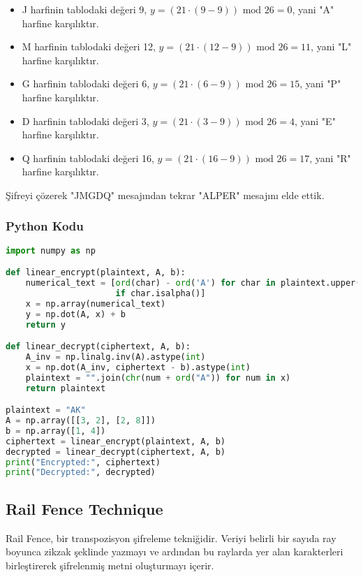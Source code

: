 \begin{itemize}
    \item J harfinin tablodaki değeri 9, $y = (21 \cdot (9 - 9)) \text{ mod } 26 = 0$, yani "A" harfine karşılıktır.
    \item M harfinin tablodaki değeri 12, $y = (21 \cdot (12 - 9)) \text{ mod } 26 = 11$, yani "L" harfine karşılıktır.
    \item G harfinin tablodaki değeri 6, $y = (21 \cdot (6 - 9)) \text{ mod } 26 = 15$, yani "P" harfine karşılıktır.
    \item D harfinin tablodaki değeri 3, $y = (21 \cdot (3 - 9)) \text{ mod } 26 = 4$, yani "E" harfine karşılıktır.
    \item Q harfinin tablodaki değeri 16, $y = (21 \cdot (16 - 9)) \text{ mod } 26 = 17$, yani "R" harfine karşılıktır.
\end{itemize}

Şifreyi çözerek "JMGDQ" mesajından tekrar "ALPER" mesajını elde ettik.

\subsubsection{Python Kodu}

\begin{lstlisting}[language=Python]
import numpy as np

def linear_encrypt(plaintext, A, b):
    numerical_text = [ord(char) - ord('A') for char in plaintext.upper()
                      if char.isalpha()]
    x = np.array(numerical_text)
    y = np.dot(A, x) + b
    return y

def linear_decrypt(ciphertext, A, b):
    A_inv = np.linalg.inv(A).astype(int)
    x = np.dot(A_inv, ciphertext - b).astype(int)
    plaintext = "".join(chr(num + ord("A")) for num in x)
    return plaintext

plaintext = "AK"
A = np.array([[3, 2], [2, 8]])
b = np.array([1, 4])
ciphertext = linear_encrypt(plaintext, A, b)
decrypted = linear_decrypt(ciphertext, A, b)
print("Encrypted:", ciphertext)
print("Decrypted:", decrypted)
\end{lstlisting}

\newpage

\subsection{Rail Fence Technique}

Rail Fence, bir transpozisyon şifreleme tekniğidir. Veriyi belirli bir sayıda ray boyunca zikzak şeklinde yazmayı ve ardından bu raylarda yer alan karakterleri birleştirerek şifrelenmiş metni oluşturmayı içerir.

